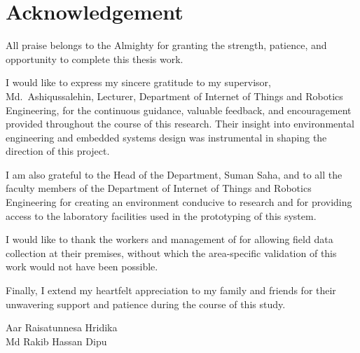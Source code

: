 \chapter*{Acknowledgement}

All praise belongs to the Almighty for granting the strength, patience, and opportunity to complete this thesis work.

I would like to express my sincere gratitude to my supervisor, {Md.\ Ashiqussalehin}, {Lecturer}, Department of Internet of Things and Robotics Engineering, for the continuous guidance, valuable feedback, and encouragement provided throughout the course of this research. Their insight into environmental engineering and embedded systems design was instrumental in shaping the direction of this project.

I am also grateful to the Head of the Department, {Suman Saha}, and to all the faculty members of the Department of Internet of Things and Robotics Engineering for creating an environment conducive to research and for providing access to the laboratory facilities used in the prototyping of this system.

I would like to thank the workers and management of  for allowing field data collection at their premises, without which the area-specific validation of this work would not have been possible.

Finally, I extend my heartfelt appreciation to my family and friends for their unwavering support and patience during the course of this study.

\vspace{1cm}
\noindent
Aar Raisatunnesa Hridika\\
Md Rakib Hassan Dipu
